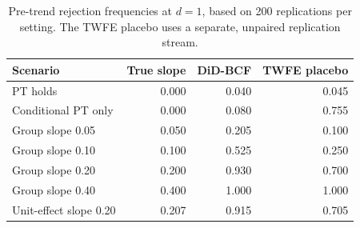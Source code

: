 \begin{table}[htbp]
\centering
\small
\caption{Pre-trend rejection frequencies at $d=1$, based on 200 replications per setting. The TWFE placebo uses a separate, unpaired replication stream.}
\label{tab:pretrend_main}
\setlength{\tabcolsep}{4pt}
\begin{tabular}{lrrr}
\toprule
Scenario & True slope & DiD-BCF & TWFE placebo \\
\midrule
PT holds & 0.000 & 0.040 & 0.045 \\
Conditional PT only & 0.000 & 0.080 & 0.755 \\
Group slope 0.05 & 0.050 & 0.205 & 0.100 \\
Group slope 0.10 & 0.100 & 0.525 & 0.250 \\
Group slope 0.20 & 0.200 & 0.930 & 0.700 \\
Group slope 0.40 & 0.400 & 1.000 & 1.000 \\
Unit-effect slope 0.20 & 0.207 & 0.915 & 0.705 \\
\bottomrule
\end{tabular}
\end{table}
